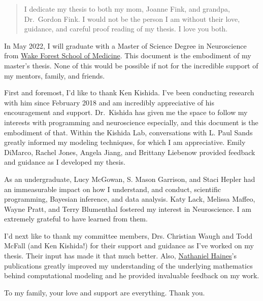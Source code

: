 
\begin{acknowledgements}

\begin{quote}
I dedicate my thesis to both my mom, Joanne Fink, and grandpa, Dr.~Gordon Fink. I would not be the person I am without their love, guidance, and careful proof reading of my thesis. I love you both.
\end{quote}

In May 2022, I will graduate with a Master of Science Degree in Neuroscience from \href{https://wakehealth.edu}{Wake Forest School of Medicine}. This document is the embodiment of my master's thesis. None of this would be possible if not for the incredible support of my mentors, family, and friends.

First and foremost, I'd like to thank Ken Kishida. I've been conducting research with him since February 2018 and am incredibly appreciative of his encouragement and support. Dr.~Kishida has given me the space to follow my interests with programming and neuroscience especially, and this document is the embodiment of that. Within the Kishida Lab, conversations with L. Paul Sands greatly informed my modeling techniques, for which I am appreciative. Emily DiMarco, Rachel Jones, Angela Jiang, and Brittany Liebenow provided feedback and guidance as I developed my thesis.

As an undergraduate, Lucy McGowan, S. Mason Garrison, and Staci Hepler had an immeasurable impact on how I understand, and conduct, scientific programming, Bayesian inference, and data analysis. Katy Lack, Melissa Maffeo, Wayne Pratt, and Terry Blumenthal fostered my interest in Neuroscience. I am extremely grateful to have learned from them.

I'd next like to thank my committee members, Drs. Christian Waugh and Todd McFall (and Ken Kishida!) for their support and guidance as I've worked on my thesis. Their input has made it that much better. Also, \href{http://haines-lab.com}{Nathaniel Haines}'s publications greatly improved my understanding of the underlying mathematics behind computational modeling and he provided invaluable feedback on my work.

To my family, your love and support are everything. Thank you.

\end{acknowledgements}

\tableofcontents

\newpage

\listoffigures

